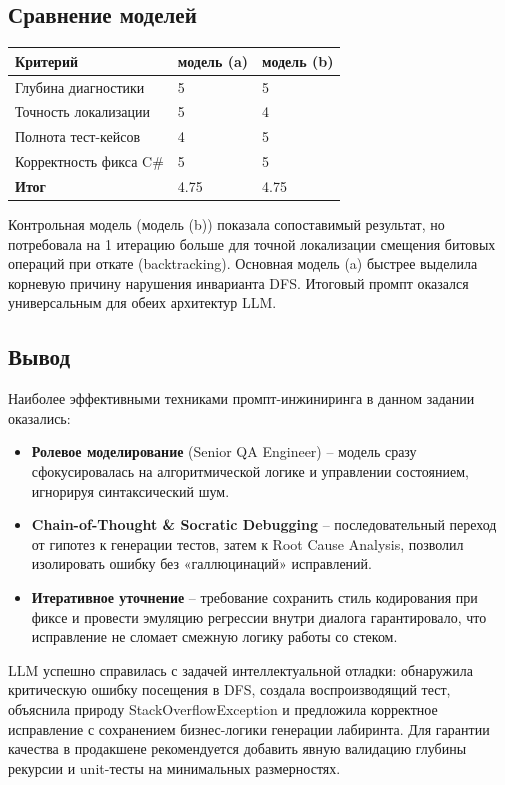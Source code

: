 \subsection{Сравнение моделей}
\begin{table}[h!]
\centering
\begin{tabular}{|l|p{5cm}|p{5cm}|}
\hline
\textbf{Критерий} & \textbf{модель (a)} & \textbf{модель (b)} \\
\hline
Глубина диагностики & 5 & 5 \\
\hline
Точность локализации & 5 & 4 \\
\hline
Полнота тест-кейсов & 4 & 5 \\
\hline
Корректность фикса C\# & 5 & 5 \\
\hline
\textbf{Итог} & 4.75 & 4.75\\
\hline
\end{tabular}
\end{table}

Контрольная модель (модель (b)) показала сопоставимый результат, но потребовала на 1 итерацию больше для точной локализации смещения битовых операций при откате (backtracking). Основная модель (a) быстрее выделила корневую причину нарушения инварианта DFS. Итоговый промпт оказался универсальным для обеих архитектур LLM.

\subsection{Вывод}
Наиболее эффективными техниками промпт-инжиниринга в данном задании оказались:
\begin{itemize}
\item \textbf{Ролевое моделирование} (Senior QA Engineer) – модель сразу сфокусировалась на алгоритмической логике и управлении состоянием, игнорируя синтаксический шум.
\item \textbf{Chain-of-Thought \& Socratic Debugging} – последовательный переход от гипотез к генерации тестов, затем к Root Cause Analysis, позволил изолировать ошибку без «галлюцинаций» исправлений.
\item \textbf{Итеративное уточнение} – требование сохранить стиль кодирования при фиксе и провести эмуляцию регрессии внутри диалога гарантировало, что исправление не сломает смежную логику работы со стеком.
\end{itemize}

LLM успешно справилась с задачей интеллектуальной отладки: обнаружила критическую ошибку посещения в DFS, создала воспроизводящий тест, объяснила природу StackOverflowException и предложила корректное исправление с сохранением бизнес-логики генерации лабиринта. Для гарантии качества в продакшене рекомендуется добавить явную валидацию глубины рекурсии и unit-тесты на минимальных размерностях.
